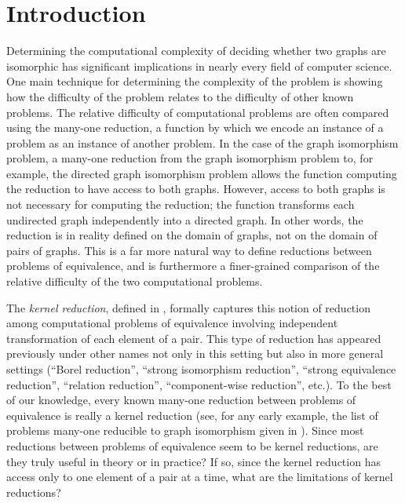 \section{Introduction}

Determining the computational complexity of deciding whether two graphs are isomorphic has significant implications in nearly every field of computer science.
One main technique for determining the complexity of the problem is showing how the difficulty of the problem relates to the difficulty of other known problems.
The relative difficulty of computational problems are often compared using the many-one reduction, a function by which we encode an instance of a problem as an instance of another problem.
In the case of the graph isomorphism problem, a many-one reduction from the graph isomorphism problem to, for example, the directed graph isomorphism problem allows the function computing the reduction to have access to both graphs.
However, access to both graphs is not necessary for computing the reduction; the function transforms each undirected graph independently into a directed graph.
In other words, the reduction is in reality defined on the domain of graphs, not on the domain of pairs of graphs.
This is a far more natural way to define reductions between problems of equivalence, and is furthermore a finer-grained comparison of the relative difficulty of the two computational problems.

The \emph{kernel reduction}, defined in \autocite[Definition~4.13]{fg11}, formally captures this notion of reduction among computational problems of equivalence involving independent transformation of each element of a pair.
This type of reduction has appeared previously under other names not only in this setting but also in more general settings (``Borel reduction'', ``strong isomorphism reduction'', ``strong equivalence reduction'', ``relation reduction'', ``component-wise reduction'', etc.).
To the best of our knowledge, every known many-one reduction between problems of equivalence is really a kernel reduction (see, for any early example, the list of problems many-one reducible to graph isomorphism given in \autocite{bc79}).
Since most reductions between problems of equivalence seem to be kernel reductions, are they truly useful in theory or in practice?
If so, since the kernel reduction has access only to one element of a pair at a time, what are the limitations of kernel reductions?

